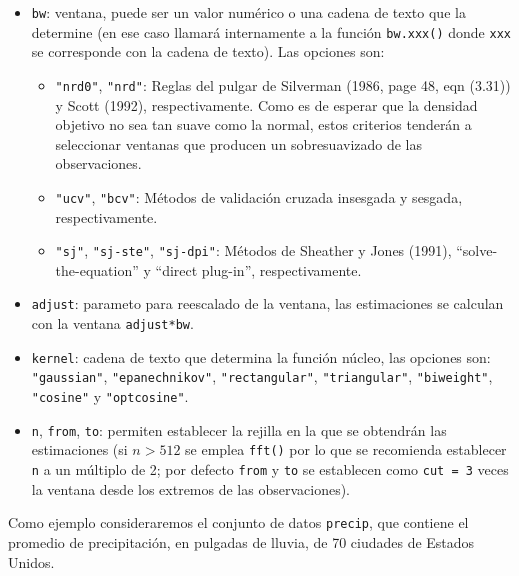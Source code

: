 \documentclass[
  10pt,
]{book}
\theoremstyle{break}
\theoremstyle{nonumberplain}
\begin{document}
\begin{itemize}
\item
  \texttt{bw}: ventana, puede ser un valor numérico o una cadena de texto que la determine
  (en ese caso llamará internamente a la función \texttt{bw.xxx()} donde \texttt{xxx} se corresponde
  con la cadena de texto). Las opciones son:

  \begin{itemize}
  \item
    \texttt{"nrd0"}, \texttt{"nrd"}: Reglas del pulgar de Silverman (1986, page 48, eqn (3.31)) y
    Scott (1992), respectivamente. Como es de esperar que la densidad objetivo
    no sea tan suave como la normal, estos criterios tenderán a seleccionar
    ventanas que producen un sobresuavizado de las observaciones.
  \item
    \texttt{"ucv"}, \texttt{"bcv"}: Métodos de validación cruzada insesgada y sesgada, respectivamente.
  \item
    \texttt{"sj"}, \texttt{"sj-ste"}, \texttt{"sj-dpi"}: Métodos de Sheather y Jones (1991),
    ``solve-the-equation'' y ``direct plug-in'', respectivamente.
  \end{itemize}
\item
  \texttt{adjust}: parameto para reescalado de la ventana, las estimaciones se calculan
  con la ventana \texttt{adjust*bw}.
\item
  \texttt{kernel}: cadena de texto que determina la función núcleo, las opciones son: \texttt{"gaussian"},
  \texttt{"epanechnikov"}, \texttt{"rectangular"}, \texttt{"triangular"}, \texttt{"biweight"}, \texttt{"cosine"} y \texttt{"optcosine"}.
\item
  \texttt{n}, \texttt{from}, \texttt{to}: permiten establecer la rejilla en la que se obtendrán las estimaciones
  (si \(n>512\) se emplea \texttt{fft()} por lo que se recomienda establecer \texttt{n} a un múltiplo de 2;
  por defecto \texttt{from} y \texttt{to} se establecen como \texttt{cut\ =\ 3} veces la ventana desde los extremos
  de las observaciones).
\end{itemize}

Como ejemplo consideraremos el conjunto de datos \texttt{precip}, que contiene el promedio de precipitación,
en pulgadas de lluvia, de 70 ciudades de Estados Unidos.
\end{document}
